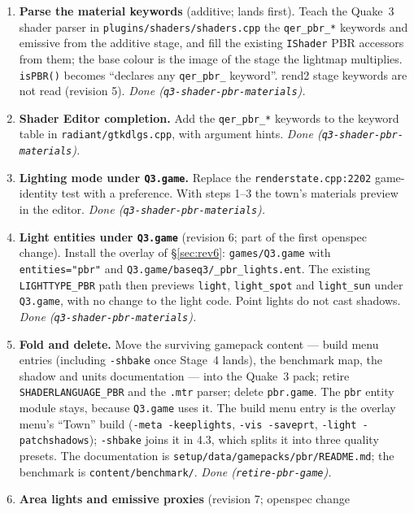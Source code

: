 \documentclass[11pt,a4paper]{article}
\begin{document}
\begin{enumerate}
\item \textbf{Parse the material keywords} (additive; lands first). Teach the Quake~3 shader
  parser in \texttt{plugins/shaders/shaders.cpp} the \texttt{qer\_pbr\_*} keywords and emissive from
  the additive stage, and fill the existing \texttt{IShader} PBR accessors from them; the base
  colour is the image of the stage the lightmap multiplies. \texttt{isPBR()} becomes ``declares any
  \texttt{qer\_pbr\_} keyword''. rend2 stage keywords are not read (revision 5). \emph{Done (\texttt{q3-shader-pbr-materials}).}
\item \textbf{Shader Editor completion.} Add the \texttt{qer\_pbr\_*} keywords to the keyword table
  in \texttt{radiant/gtkdlgs.cpp}, with argument hints. \emph{Done (\texttt{q3-shader-pbr-materials}).}
\item \textbf{Lighting mode under \texttt{Q3.game}.} Replace the \texttt{renderstate.cpp:2202}
  game-identity test with a preference. With steps 1--3 the town's materials preview in the editor. \emph{Done (\texttt{q3-shader-pbr-materials}).}
\item \textbf{Light entities under \texttt{Q3.game}} (revision 6; part of the first openspec
  change). Install the overlay of §\ref{sec:rev6}: \texttt{games/Q3.game} with
  \texttt{entities="pbr"} and \texttt{Q3.game/baseq3/\_pbr\_lights.ent}. The existing
  \texttt{LIGHTTYPE\_PBR} path then previews \texttt{light}, \texttt{light\_spot} and
  \texttt{light\_sun} under \texttt{Q3.game}, with no change to the light code. Point lights do not
  cast shadows. \emph{Done (\texttt{q3-shader-pbr-materials}).}
\item \textbf{Fold and delete.} Move the surviving gamepack content --- build menu entries
  (including \texttt{-shbake} once Stage~4 lands), the benchmark map, the shadow and units
  documentation --- into the Quake~3 pack; retire \texttt{SHADERLANGUAGE\_PBR} and the
  \texttt{.mtr} parser; delete \texttt{pbr.game}. The \texttt{pbr} entity module stays, because
  \texttt{Q3.game} uses it. The build menu entry is the overlay menu's ``Town'' build
  (\texttt{-meta -keeplights}, \texttt{-vis -saveprt}, \texttt{-light -patchshadows}); \texttt{-shbake}
  joins it in 4.3, which splits it into three quality presets. The documentation is \texttt{setup/data/gamepacks/pbr/README.md}; the benchmark is
  \texttt{content/benchmark/}. \emph{Done (\texttt{retire-pbr-game}).}
\item \textbf{Area lights and emissive proxies} (revision 7; openspec change

\end{enumerate}
\end{document}
